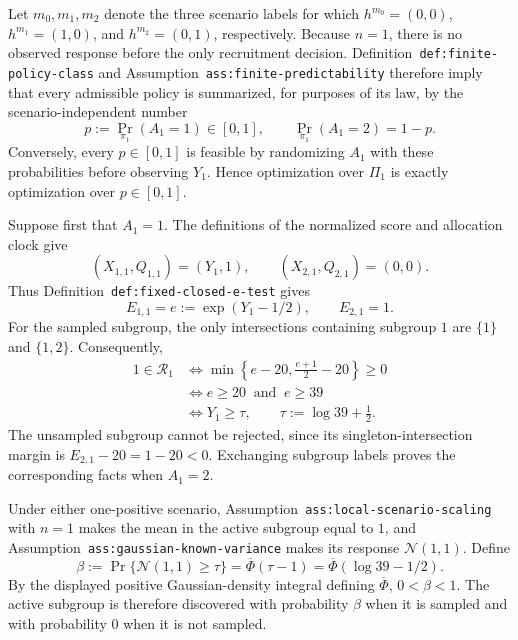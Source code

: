 Let \(m_0,m_1,m_2\) denote the three scenario labels for which \(h^{m_0}=(0,0)\), \(h^{m_1}=(1,0)\), and \(h^{m_2}=(0,1)\), respectively.  Because \(n=1\), there is no observed response before the only recruitment decision.  Definition~\texttt{def:finite-policy-class} and Assumption~\texttt{ass:finite-predictability} therefore imply that every admissible policy is summarized, for purposes of its law, by the scenario-independent number
\[
 p:=\Pr_{\pi_1}(A_1=1)\in[0,1],
 \qquad
 \Pr_{\pi_1}(A_1=2)=1-p.
\]
Conversely, every \(p\in[0,1]\) is feasible by randomizing \(A_1\) with these probabilities before observing \(Y_1\).  Hence optimization over \(\Pi_1\) is exactly optimization over \(p\in[0,1]\).

Suppose first that \(A_1=1\).  The definitions of the normalized score and allocation clock give
\[
 (X_{1,1},Q_{1,1})=(Y_1,1),
 \qquad
 (X_{2,1},Q_{2,1})=(0,0).
\]
Thus Definition~\texttt{def:fixed-closed-e-test} gives
\[
 E_{1,1}=e:=\exp(Y_1-1/2),
 \qquad E_{2,1}=1.
\]
For the sampled subgroup, the only intersections containing subgroup \(1\) are \(\{1\}\) and \(\{1,2\}\).  Consequently,
\[
\begin{aligned}
 1\in\mathcal R_1
 &\iff \min\left\{e-20,\frac{e+1}{2}-20\right\}\geq0 \\
 &\iff e\geq20\ \text{ and }\ e\geq39 \\
 &\iff Y_1\geq \tau,
 \qquad \tau:=\log 39+\frac12.
\end{aligned}
\]
The unsampled subgroup cannot be rejected, since its singleton-intersection margin is \(E_{2,1}-20=1-20<0\).  Exchanging subgroup labels proves the corresponding facts when \(A_1=2\).

Under either one-positive scenario, Assumption~\texttt{ass:local-scenario-scaling} with \(n=1\) makes the mean in the active subgroup equal to \(1\), and Assumption~\texttt{ass:gaussian-known-variance} makes its response \(\mathcal N(1,1)\).  Define
\[
 \beta:=\Pr\{\mathcal N(1,1)\geq\tau\}
 =\overline\Phi(\tau-1)
 =\overline\Phi(\log 39-1/2).
\]
By the displayed positive Gaussian-density integral defining \(\overline\Phi\), \(0<\beta<1\).  The active subgroup is therefore discovered with probability \(\beta\) when it is sampled and with probability \(0\) when it is not sampled.

